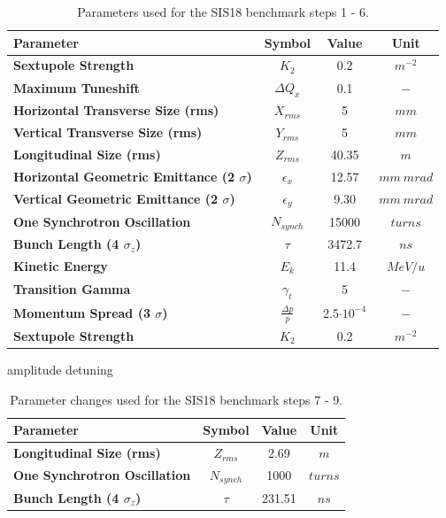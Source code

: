 \documentclass[a4paper]{cernatsnote}
\begin{document}
\begin{table}
	\begin{center}
		\begin{tabular}[!b]{|l|c|c|c|}
			\hline
			\textbf{Parameter} & \textbf{Symbol} & \textbf{Value} & \textbf{Unit} \\
			\hline
			\textbf{Sextupole Strength} & $K_2$ & 0.2 & $m^{-2}$ \\
			\textbf{Maximum Tuneshift} & $\Delta Q_x$ & 0.1 & $-$ \\
			\textbf{Horizontal Transverse Size (rms)} & $X_{rms}$ & 5 & $mm$ \\
			\textbf{Vertical Transverse Size (rms)} & $Y_{rms}$ & 5 & $mm$ \\
			\textbf{Longitudinal Size (rms)} & $Z_{rms}$ & 40.35 & $m$ \\
			\textbf{Horizontal Geometric Emittance (2 $\sigma$)} & $\epsilon_x$ & 12.57 & $mm~mrad$ \\
			\textbf{Vertical Geometric Emittance (2 $\sigma$)} & $\epsilon_y$ & 9.30 & $mm~mrad$ \\
			\textbf{One Synchrotron Oscillation} & $N_{synch}$ & 15000 & $turns$ \\
			\textbf{Bunch Length (4 $\sigma_z$)} & $\tau$ & 3472.7 & $ns$ \\
			\textbf{Kinetic Energy} & $E_k$ & 11.4 & $MeV/u$ \\
			\textbf{Transition Gamma} & $\gamma_t$ & 5 & $-$ \\
			\textbf{Momentum Spread (3 $\sigma$)} & $\frac{\Delta p}{p}$ & 2.5$\cdot 10^{-4}$ & $-$ \\
			\textbf{Sextupole Strength} & $K_2$ & 0.2 & $m^{-2}$ \\
			\hline
		\end{tabular}
		\caption{Parameters used for the SIS18 benchmark steps 1 - 6.}
		\label{tab:parameters16}
	\end{center}
\end{table}

\begin{table}
	\begin{center}amplitude detuning
		\begin{tabular}[!b]{|l|c|c|c|}
			\hline
			\textbf{Parameter} & \textbf{Symbol} & \textbf{Value} & \textbf{Unit} \\
			\hline
			\textbf{Longitudinal Size (rms)} & $Z_{rms}$ & 2.69 & $m$ \\
			\textbf{One Synchrotron Oscillation} & $N_{synch}$ & 1000 & $turns$ \\
			\textbf{Bunch Length (4 $\sigma_z$)} & $\tau$ &  231.51 & $ns$ \\
			\hline
		\end{tabular}
		\caption{Parameter changes used for the SIS18 benchmark steps 7 - 9.}
		\label{tab:parameters79}
	\end{center}
\end{table}
\end{document}

